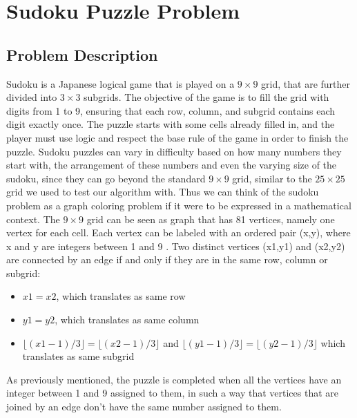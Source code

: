 \section{Sudoku Puzzle Problem}
\label{sec:problem_description}
\subsection{Problem Description}
{Sudoku is a Japanese logical game that is played on a $9 \times 9$ grid, that are further divided into $3 \times 3$ subgrids. The objective of the game is to fill the grid with digits from 1 to 9, ensuring that each row, column, and subgrid contains each digit exactly once\cite{Mantere2007}. The puzzle starts with some cells already filled in, and the player must use logic and respect the base rule of the game in order to finish the puzzle.}
{\newline}
{\newline Sudoku puzzles can vary in difficulty based on how many numbers they start with, the arrangement of these numbers and even the varying size of the sudoku, since they can go beyond the standard $9 \times 9$ grid, similar to the $25 \times 25$ grid we used to test our algorithm with. Thus we can think of the sudoku problem as a graph coloring problem if it were to be expressed in a mathematical context. The $9 \times 9$ grid can be seen as graph that has 81 vertices, namely one vertex for each cell. Each vertex can be labeled with an ordered pair (x,y), where x and y are integers between 1 and 9 \cite{WikiMathematics}. Two distinct vertices (x1,y1) and (x2,y2) are connected by an edge if and only if they are in the same row, column or subgrid:}
\begin {itemize}
    \item $x1 = x2$, which translates as same row
    \item $y1 = y2$, which translates as same column
    \item $\lfloor (x1-1)/3 \rfloor = \lfloor (x2-1)/3 \rfloor$ and $\lfloor (y1-1)/3 \rfloor = \lfloor (y2-1)/3 \rfloor$ which translates as same subgrid
\end {itemize}
{As previously mentioned, the puzzle is completed when all the vertices have an integer between 1 and 9 assigned to them, in such a way that vertices that are joined by an edge don't have the same number assigned to them. }
